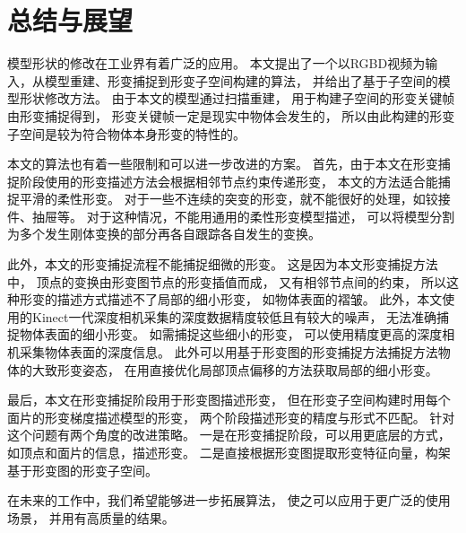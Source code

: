 \chapter{总结与展望}
模型形状的修改在工业界有着广泛的应用。
本文提出了一个以RGBD视频为输入，从模型重建、形变捕捉到形变子空间构建的算法，
并给出了基于子空间的模型形状修改方法。
由于本文的模型通过扫描重建，
用于构建子空间的形变关键帧由形变捕捉得到，
形变关键帧一定是现实中物体会发生的，
所以由此构建的形变子空间是较为符合物体本身形变的特性的。

本文的算法也有着一些限制和可以进一步改进的方案。
首先，由于本文在形变捕捉阶段使用的形变描述方法会根据相邻节点约束传递形变，
本文的方法适合能捕捉平滑的柔性形变。
对于一些不连续的突变的形变，就不能很好的处理，如铰接件、抽屉等。
对于这种情况，不能用通用的柔性形变模型描述，
可以将模型分割为多个发生刚体变换的部分再各自跟踪各自发生的变换。

此外，本文的形变捕捉流程不能捕捉细微的形变。
这是因为本文形变捕捉方法中，
顶点的变换由形变图节点的形变插值而成，
又有相邻节点间的约束，
所以这种形变的描述方式描述不了局部的细小形变，
如物体表面的褶皱。
此外，本文使用的Kinect一代深度相机采集的深度数据精度较低且有较大的噪声，
无法准确捕捉物体表面的细小形变。
如需捕捉这些细小的形变，
可以使用精度更高的深度相机采集物体表面的深度信息。
此外可以用基于形变图的形变捕捉方法捕捉方法物体的大致形变姿态，
在用直接优化局部顶点偏移的方法获取局部的细小形变。

最后，本文在形变捕捉阶段用于形变图描述形变，
但在形变子空间构建时用每个面片的形变梯度描述模型的形变，
两个阶段描述形变的精度与形式不匹配。
针对这个问题有两个角度的改进策略。
一是在形变捕捉阶段，可以用更底层的方式，如顶点和面片的信息，描述形变。
二是直接根据形变图提取形变特征向量，构架基于形变图的形变子空间。

在未来的工作中，我们希望能够进一步拓展算法，
使之可以应用于更广泛的使用场景，
并用有高质量的结果。
